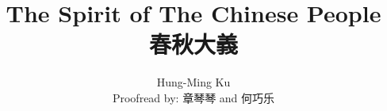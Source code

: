 \documentclass[a4paper,12pt]{book}
\begin{document}
\title{The Spirit of The Chinese People \\ 春秋大義}
\author{Hung-Ming Ku \\ Proofread by: 章琴琴 and 何巧乐}

\maketitle



\tableofcontents

\frontmatter
    
    

\mainmatter
    
    
    
    
    
    
    
    \begin{appendices}
        
    \end{appendices}

    
    
\end{document}
